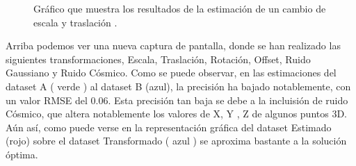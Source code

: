 \begin{figure}[H]
\begin{center}
\hspace{0.5cm}

\end{center}

\caption{Gráfico que muestra los resultados de la estimación de un cambio de escala y traslación .}
\end{figure}

Arriba podemos ver una nueva captura de pantalla, donde se han realizado las siguientes transformaciones, Escala, Traslación, Rotación, Offset, Ruido Gaussiano y Ruido Cósmico.
Como se puede observar, en las estimaciones del dataset A ( verde ) al dataset B (azul), la precisión ha bajado notablemente, con un valor RMSE del 0.06.
Esta precisión tan baja se debe a la incluisión de ruido Cósmico, que altera notablemente los valores de X, Y , Z  de algunos puntos 3D.
Aún así, como puede verse en  la representación gráfica del dataset Estimado (rojo) sobre el dataset Transformado ( azul ) se aproxima bastante a la solución óptima.



